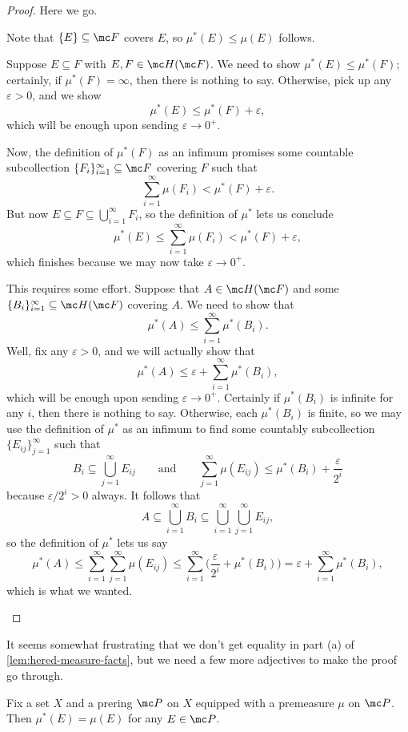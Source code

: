 \documentclass[../notes.tex]{subfiles}
\begin{document}
\begin{proof}
	Here we go.
	\begin{listalph}
		\item Note that $\{E\}\subseteq\mc F$ covers $E$, so $\mu^*(E)\le\mu(E)$ follows.
		\item Suppose $E\subseteq F$ with $E,F\in\mc H(\mc F)$. We need to show $\mu^*(E)\le\mu^*(F)$; certainly, if $\mu^*(F)=\infty$, then there is nothing to say. Otherwise, pick up any $\varepsilon>0$, and we show
		\[\mu^*(E)\le\mu^*(F)+\varepsilon,\]
		which will be enough upon sending $\varepsilon\to0^+$.

		Now, the definition of $\mu^*(F)$ as an infimum promises some countable subcollection $\{F_i\}_{i=1}^\infty\subseteq\mc F$ covering $F$ such that
		\[\sum_{i=1}^\infty\mu(F_i)<\mu^*(F)+\varepsilon.\]
		But now $E\subseteq F\subseteq\bigcup_{i=1}^\infty F_i$, so the definition of $\mu^*$ lets us conclude
		\[\mu^*(E)\le\sum_{i=1}^\infty\mu(F_i)<\mu^*(F)+\varepsilon,\]
		which finishes because we may now take $\varepsilon\to0^+$.
		\item This requires some effort. Suppose that $A\in\mc H(\mc F)$ and some $\{B_i\}_{i=1}^\infty\subseteq\mc H(\mc F)$ covering $A$. We need to show that
		\[\mu^*(A)\le\sum_{i=1}^\infty\mu^*(B_i).\]
		Well, fix any $\varepsilon>0$, and we will actually show that
		\[\mu^*(A)\le\varepsilon+\sum_{i=1}^\infty\mu^*(B_i),\]
		which will be enough upon sending $\varepsilon\to0^+$. Certainly if $\mu^*(B_i)$ is infinite for any $i$, then there is nothing to say. Otherwise, each $\mu^*(B_i)$ is finite, so we may use the definition of $\mu^*$ as an infimum to find some countably subcollection $\{E_{ij}\}_{j=1}^\infty$ such that
		\[B_i\subseteq\bigcup_{j=1}^\infty E_{ij}\qquad\text{and}\qquad\sum_{j=1}^\infty\mu(E_{ij})\le\mu^*(B_i)+\frac{\varepsilon}{2^i}\]
		because $\varepsilon/2^i>0$ always. It follows that
		\[A\subseteq\bigcup_{i=1}^\infty B_i\subseteq\bigcup_{i=1}^\infty\bigcup_{j=1}^\infty E_{ij},\]
		so the definition of $\mu^*$ lets us say
		\[\mu^*(A)\le\sum_{i=1}^\infty\sum_{j=1}^\infty\mu(E_{ij})\le\sum_{i=1}^\infty\Bigg(\frac{\varepsilon}{2^i}+\mu^*(B_i)\Bigg)=\varepsilon+\sum_{i=1}^\infty\mu^*(B_i),\]
		which is what we wanted.
		\qedhere
	\end{listalph}
\end{proof}
It seems somewhat frustrating that we don't get equality in part (a) of \autoref{lem:hered-measure-facts}, but we need a few more adjectives to make the proof go through.
\begin{lemma} \label{lem:hered-measure-extends}
	Fix a set $X$ and a prering $\mc P$ on $X$ equipped with a premeasure $\mu$ on $\mc P$. Then $\mu^*(E)=\mu(E)$ for any $E\in\mc P$.
\end{lemma}
\end{document}
